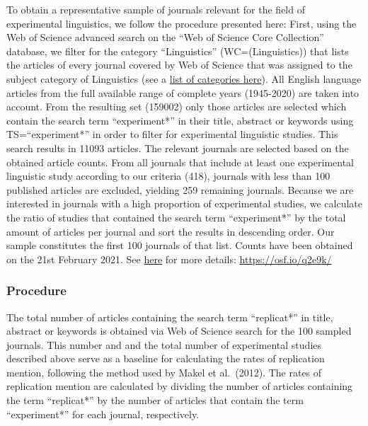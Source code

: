 \documentclass[
  english,
  man]{apa6}
\begin{document}
To obtain a representative sample of journals relevant for the field of experimental linguistics, we follow the procedure presented here:
First, using the Web of Science advanced search on the \enquote{Web of Science Core Collection} database, we filter for the category \enquote{Linguistics} (WC=(Linguistics)) that lists the articles of every journal covered by Web of Science that was assigned to the subject category of Linguistics (see a \href{http://images.webofknowledge.com/WOKRS535R111/help/WOS/hp_subject_category_terms_tasca.html}{list of categories here}).
All English language articles from the full available range of complete years (1945-2020) are taken into account.
From the resulting set (159002) only those articles are selected which contain the search term \enquote{experiment*} in their title, abstract or keywords using TS=\enquote{experiment*} in order to filter for experimental linguistic studies. This search results in 11093 articles. The relevant journals are selected based on the obtained article counts.
From all journals that include at least one experimental linguistic study according to our criteria (418), journals with less than 100 published articles are excluded, yielding 259 remaining journals.
Because we are interested in journals with a high proportion of experimental studies, we calculate the ratio of studies that contained the search term \enquote{experiment*} by the total amount of articles per journal and sort the results in descending order.
Our sample constitutes the first 100 journals of that list.
Counts have been obtained on the 21st February 2021. See \href{https://osf.io/q2e9k/}{here} for more details: \url{https://osf.io/q2e9k/}

\hypertarget{procedure}{%
\subsubsection{Procedure}\label{procedure}}

The total number of articles containing the search term \enquote{replicat*} in title, abstract or keywords is obtained via Web of Science search for the 100 sampled journals.
This number and and the total number of experimental studies described above serve as a baseline for calculating the rates of replication mention, following the method used by Makel et al.~(2012).
The rates of replication mention are calculated by dividing the number of articles containing the term \enquote{replicat*} by the number of articles that contain the term \enquote{experiment*} for each journal, respectively.
\end{document}

